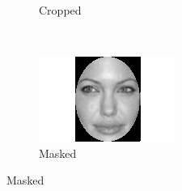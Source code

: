 \documentclass{llncs}
\begin{document}
\begin{figure}[t]
\begin{subfigure}[b]{0.2\textwidth}
                \caption{Cropped}
                \label{fig:cropped} 
        \end{subfigure}
        ~ ~
        \begin{subfigure}[b]{0.2\textwidth}
                \centering
                \includegraphics[width=\textwidth]{angelina/Angelina_Jolie_0006_masked}
                \caption{Masked}
                \label{fig:masked}
        \end{subfigure}%
%


\end{figure}
\end{document}
